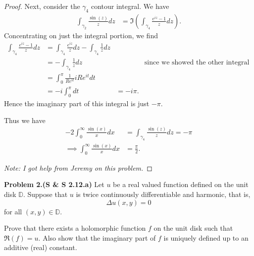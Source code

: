 \documentclass[leqno]{article}
\theoremstyle{nonumberplain}
\newtheorem{proof}{Proof}
\begin{document}
\begin{proof}
Next, consider the $\gamma_4$ contour integral.  We have
\begin{align*}
\int_{\gamma_2}\frac{\sin(z)}{z}dz &= \Im\left( \int_{\gamma_4} \frac{e^{iz}-1}{z}dz\right).
\end{align*}
Concentrating on just the integral portion, we find
\begin{align*}
\int_{\gamma_4}\frac{e^{iz}-1}{z}dz &= \int_{\gamma_4} \frac{e^{iz}}{z}dz - \int_{\gamma_4}\frac{1}{z}dz\\
&= -\int_{\gamma_4}\frac{1}{z}dz &&\textrm{since we showed the other integral goes to zero in class}\\
&=\int_0^\pi \frac{1}{Re^{it}}iRe^{it}dt\\
&=-i\int_0^\pi dt &= -i\pi.
\end{align*}
Hence the imaginary part of this integral is just $-\pi$.

Thus we have
\begin{align*}
-2\int_0^\infty \frac{\sin(x)}{x}dx &= \int_{\gamma_4}\frac{\sin(z)}{z}dz=-\pi\\
\implies \int_0^\infty \frac{\sin(x)}{x}dx &= \frac{\pi}{2}.
\end{align*}

\noindent \emph{Note: I got help from Jeremy on this problem.}
\end{proof}

\vspace*{1cm}


\noindent\textbf{Problem 2.(S \& S 2.12.a)} Let $u$ be a real valued function defined on the unit disk $\mathbb{D}$. Suppose that $u$ is twice continuously differentiable and harmonic, that is, 
\[
\Delta u(x,y) = 0
\]
for all $(x,y)\in \mathbb{D}$. 

Prove that there exists a holomorphic function $f$ on the unit disk such that $\Re(f)=u$. Also show that the imaginary part of $f$ is uniquely defined up to an additive (real) constant.
\end{document}
